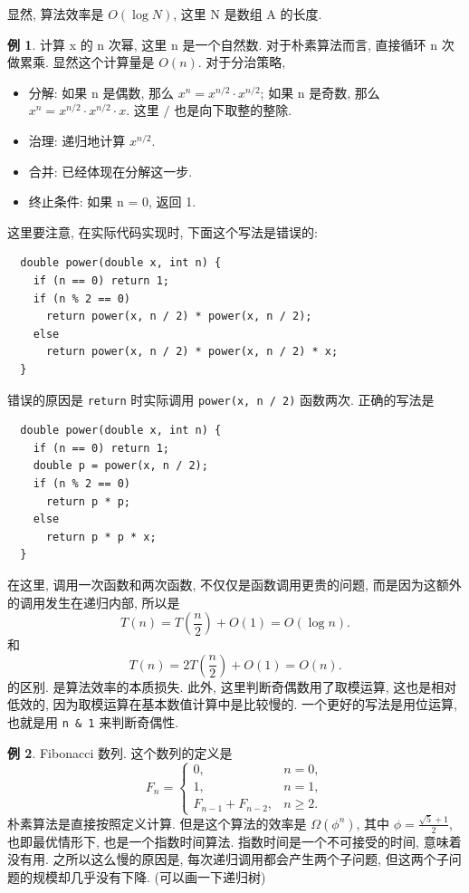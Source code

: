 \documentclass[a4paper]{ctexart}
\theoremstyle{definition}
\theoremstyle{definition}
\newtheorem{example}{例}[section]
\begin{document}
显然, 算法效率是 $O(\log N)$, 这里 N 是数组 A 的长度.

\begin{example}
  计算 x 的 n 次幂, 这里 n 是一个自然数. 对于朴素算法而言, 直接循环 n 次做累乘. 显然这个计算量是 $O(n)$. 对于分治策略, 
  \begin{itemize}
    \item 分解: 如果 n 是偶数, 那么 $x^n = x^{n / 2} \cdot x^{n / 2}$; 如果 n 是奇数, 那么 $x^n = x^{n / 2} \cdot x^{n / 2} \cdot x$. 这里 $/$ 也是向下取整的整除. 
    \item 治理: 递归地计算 $x^{n / 2}$.
    \item 合并: 已经体现在分解这一步. 
    \item 终止条件: 如果 n = 0, 返回 1.
  \end{itemize}
\end{example}

这里要注意, 在实际代码实现时, 下面这个写法是错误的:

\begin{verbatim}
  double power(double x, int n) { 
    if (n == 0) return 1;
    if (n % 2 == 0)
      return power(x, n / 2) * power(x, n / 2);
    else 
      return power(x, n / 2) * power(x, n / 2) * x; 
  }
\end{verbatim}

错误的原因是 \verb|return| 时实际调用 \verb|power(x, n / 2)| 函数两次.
正确的写法是 

\begin{verbatim}
  double power(double x, int n) { 
    if (n == 0) return 1;
    double p = power(x, n / 2);
    if (n % 2 == 0)
      return p * p;
    else 
      return p * p * x;
  }
\end{verbatim}

在这里, 调用一次函数和两次函数, 不仅仅是函数调用更贵的问题, 而是因为这额外的调用发生在递归内部, 
所以是
\begin{equation}
  T(n) = T(\frac{n}{2}) + O(1) = O(\log n).
\end{equation}
和
\begin{equation}
  T(n) = 2T(\frac{n}{2}) + O(1) = O(n).
\end{equation}
的区别. 是算法效率的本质损失. 此外, 这里判断奇偶数用了取模运算, 这也是相对低效的, 
因为取模运算在基本数值计算中是比较慢的. 一个更好的写法是用位运算, 
也就是用 \verb|n & 1| 来判断奇偶性.

\begin{example}
  Fibonacci 数列. 这个数列的定义是 
  \begin{equation}
    F_n = \left\{
      \begin{array}{ll}
        0, & n = 0, \\
        1, & n = 1, \\
        F_{n - 1} + F_{n - 2}, & n \geq 2.
      \end{array}
    \right.
    \end{equation}
  朴素算法是直接按照定义计算. 但是这个算法的效率是 $\Omega(\phi^n)$, 其中 $\phi = \frac{\sqrt{5} + 1}{2}$, 
  也即最优情形下, 也是一个指数时间算法. 指数时间是一个不可接受的时间, 意味着没有用. 之所以这么慢的原因是, 每次递归调用都会产生两个子问题, 
  但这两个子问题的规模却几乎没有下降. (可以画一下递归树)
\end{example}
\end{document}
